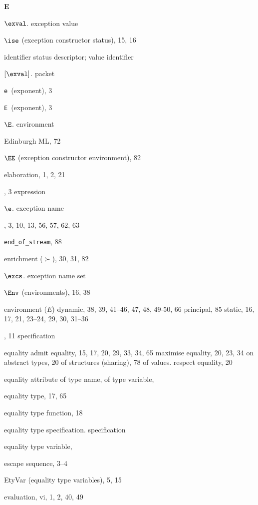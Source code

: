 \begin{theindex}
\indexspace
\parbox{64mm}{\hfil{\large\bf E}\hfil}
\indexspace
\item $\exval$. \see exception value
\item $\ise$ (exception constructor status), 15, 16
\item \seealso identifier status descriptor; value identifier
\item $[\exval]$. \see packet
\item \verb+e+\ (exponent), 3
\item \verb+E+\ (exponent), 3
\item $\E$. \see environment
\item Edinburgh ML, 72
\item $\EE$ (exception constructor environment), 82
\item elaboration, 1, 2, 21
\item \ELSE, 3
\subitem \seealso expression
\item $\e$. \see exception name
\item \END, 3, 10, 13, 56, 57, 62, 63
\item \verb+end_of_stream+, 88
\item enrichment ($\succ$), 30, 31, 82
\item $\excs$. \see exception name set
\item $\Env$ (environments), 16, 38
\item environment ($E$)
\subitem dynamic, 38, 39, 41--46, 47, 48, 49-50, 66
\subitem principal, 85
\subitem static, 16, 17, 21, 23--24, 29, 30, 31--36
\item \EQTYPE, 11
\subitem \seealso specification
\item equality
\subitem admit equality, 15, 17, 20, 29, 33, 34, 65
\subitem maximise equality, 20, 23, 34
\subitem on abstract types, 20
\subitem of structures (sharing), 78
\subitem of values. \see \boxml{=}
\subitem respect equality, 20
\item equality attribute
\subitem of type name, \eqtynamerefs
\subitem of type variable, \eqtyvarrefs
\item equality type, 17, 65
\item equality type function, 18
\item equality type specification. \see specification
\item equality type variable, \eqtyvarrefs
\item escape sequence, 3--4
\item EtyVar (equality type variables), 5, 15
\item evaluation, vi, 1, 2, 40, 49

\end{theindex}

